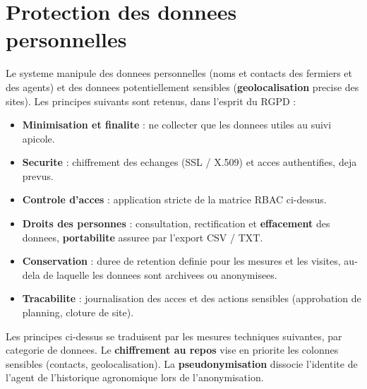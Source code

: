 \section{Protection des donnees personnelles}
Le systeme manipule des donnees personnelles (noms et contacts des fermiers et
des agents) et des donnees potentiellement sensibles (\textbf{geolocalisation}
precise des sites). Les principes suivants sont retenus, dans l'esprit du RGPD :
\begin{itemize}
  \item \textbf{Minimisation et finalite} : ne collecter que les donnees utiles au suivi apicole.
  \item \textbf{Securite} : chiffrement des echanges (SSL / X.509) et acces authentifies, deja prevus.
  \item \textbf{Controle d'acces} : application stricte de la matrice RBAC ci-dessus.
  \item \textbf{Droits des personnes} : consultation, rectification et \textbf{effacement} des donnees, \textbf{portabilite} assuree par l'export CSV / TXT.
  \item \textbf{Conservation} : duree de retention definie pour les mesures et les visites, au-dela de laquelle les donnees sont archivees ou anonymisees.
  \item \textbf{Tracabilite} : journalisation des acces et des actions sensibles (approbation de planning, cloture de site).
\end{itemize}

Les principes ci-dessus se traduisent par les mesures techniques suivantes, par
categorie de donnees. Le \textbf{chiffrement au repos} vise en priorite les
colonnes sensibles (contacts, geolocalisation). La \textbf{pseudonymisation}
dissocie l'identite de l'agent de l'historique agronomique lors de l'anonymisation.

